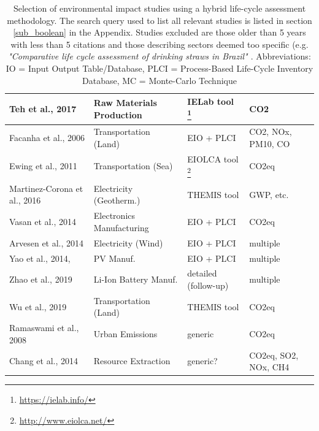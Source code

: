 \documentclass{article}
\begin{document}
\begin{table}[htbp]
\begin{tabularx}{\textwidth}{| X | X | X | X |}
                \hline
                    Teh et al., 2017 \cite{teh_hybrid_2017} & Raw Materials Production & IELab tool \footnote{\url{https://ielab.info/}} & CO2 \\
                \hline
                    Facanha et al., 2006 \cite{horvath_environmental_2006} & Transportation (Land) & EIO + PLCI & CO2, NOx, PM10, CO \\
                \hline
                    Ewing et al., 2011 \cite{ewing_insights_2011} & Transportation (Sea) & EIOLCA tool \footnote{\url{http://www.eiolca.net/}} & CO2eq \\
                \hline
                    Martinez-Corona et al., 2016 \cite{martinez-corona_hybrid_2017} & Electricity (Geotherm.) & THEMIS tool \cite{gibon_methodology_2015} & GWP, etc. \\
                \hline
                    Vasan et al., 2014 \cite{vasan_carbon_2014} & Electronics Manufacturing & EIO + PLCI & CO2eq \\
                \hline
                    Arvesen et al., 2014 \cite{arvesen_life_2014} & Electricity (Wind) & EIO + PLCI & multiple \\
                \hline
                    Yao et al., 2014, \cite{yao_hybrid_2014} & PV Manuf. & EIO + PLCI & multiple \\
                \hline
                    Zhao et al., 2019 \cite{zhao_comparative_2019} & Li-Ion Battery Manuf. & detailed (follow-up) & multiple \\
                \hline
                    Wu et al., 2019 \cite{wu_assessing_2019} & Transportation (Land) & THEMIS tool \cite{gibon_methodology_2015} & CO2eq \\
                \hline
                    Ramaswami et al., 2008 \cite{ramaswami_demand-centered_2008} & Urban Emissions & generic & CO2eq \\
                \hline
                    Chang et al., 2014 \cite{chang_shale--well_2014} & Resource Extraction & generic? & CO2eq, SO2, NOx, CH4 \\
                \hline
            \end{tabularx}
            \caption{Selection of environmental impact studies using a hybrid life-cycle assessment methodology. The search query used to list all relevant studies is listed in section \ref{sub_boolean} in the Appendix. Studies excluded are those older than 5 years with less than 5 citations and those describing sectors deemed too specific (e.g. \textit{"Comparative life cycle assessment of drinking straws in Brazil" \cite{zanghelini_comparative_2020}}. Abbreviations: IO = Input Output Table/Database, PLCI = Process-Based Life-Cycle Inventory Database, MC = Monte-Carlo Technique}
        \end{table}
\end{document}
